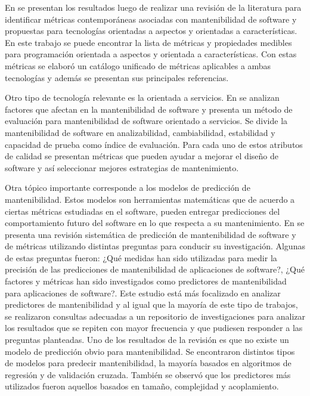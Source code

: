  En \cite{SystematicReview} se presentan los resultados luego de realizar
 una revisión de la literatura para identificar métricas contemporáneas 
 asociadas con mantenibilidad de software y propuestas para tecnologías
 orientadas a aspectos y orientadas a características. En este trabajo
 se puede encontrar la lista de métricas y propiedades medibles para programación
 orientada a aspectos y orientada a características. Con estas métricas se 
 elaboró un catálogo unificado de métricas aplicables a ambas tecnologías
 y además se presentan sus principales referencias.

 Otro tipo de tecnología relevante es la orientada a servicios. En
 \cite{ResearchOnMaintainability} se analizan factores que afectan en la mantenibilidad
 de software y presenta un método de evaluación para mantenibilidad de software
 orientado a servicios. Se divide la mantenibilidad de software en analizabilidad,
cambiabilidad, estabilidad y capacidad de prueba como índice de evaluación. Para
cada uno de estos atributos de calidad se presentan métricas que pueden ayudar
a mejorar el diseño de software y así seleccionar mejores estrategias de mantenimiento.

Otra tópico importante corresponde a los modelos de predicción de mantenibilidad.
Estos modelos son herramientas matemáticas que de acuerdo a ciertas métricas
estudiadas en el software, pueden entregar predicciones del comportamiento futuro
del software en lo que respecta a su mantenimiento.
En \cite{Riaz:2009} se presenta una revisión sistemática de predicción de mantenibilidad
de software y de métricas utilizando distintas preguntas para conducir su investigación.
Algunas de estas preguntas fueron: ¿Qué medidas han sido utilizadas para
medir la precisión de las predicciones de mantenibilidad de aplicaciones de software?,
¿Qué factores y métricas han sido investigados como predictores de mantenibilidad
para aplicaciones de software?. Este estudio está más focalizado en analizar
predictores de mantenibilidad y al igual que la mayoría de este tipo de trabajos,
se realizaron consultas adecuadas a un repositorio de investigaciones para
analizar los resultados que se repiten con mayor frecuencia y que pudiesen responder
a las preguntas planteadas.
Uno de los resultados de la revisión es que no existe un modelo de predicción
obvio para mantenibilidad. Se encontraron distintos tipos de modelos para predecir
mantenibilidad, la mayoría basados en algoritmos de regresión y de validación
cruzada. También se observó que los predictores más utilizados fueron aquellos
basados en tamaño, complejidad y acoplamiento.


